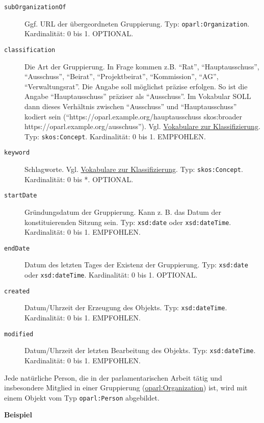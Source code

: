 \documentclass[,a4paper]{article}
\begin{document}
\begin{description}
\item[\texttt{subOrganizationOf}]
Ggf. URL der übergeordneten Gruppierung. Typ:
\texttt{oparl:Organization}. Kardinalität: 0 bis 1. OPTIONAL.
\item[\texttt{classification}]
Die Art der Gruppierung. In Frage kommen z.B. ``Rat'',
``Hauptausschuss'', ``Ausschuss'', ``Beirat'', ``Projektbeirat'',
``Kommission'', ``AG'', ``Verwaltungsrat''. Die Angabe soll möglichst
präzise erfolgen. So ist die Angabe ``Hauptausschuss'' präziser als
``Ausschuss''. Im Vokabular SOLL dann dieses Verhältnis zwischen
``Ausschuss'' und ``Hauptausschuss'' kodiert sein
(``https://oparl.example.org/hauptausschuss skos:broader
https://oparl.example.org/ausschuss''). Vgl.
\hyperref[vokabulareux5fklassifizierung]{Vokabulare zur
Klassifizierung}. Typ: \texttt{skos:Concept}. Kardinalität: 0 bis 1.
EMPFOHLEN.
\item[\texttt{keyword}]
Schlagworte. Vgl. \hyperref[vokabulareux5fklassifizierung]{Vokabulare
zur Klassifizierung}. Typ: \texttt{skos:Concept}. Kardinalität: 0 bis *.
OPTIONAL.
\item[\texttt{startDate}]
Gründungsdatum der Gruppierung. Kann z. B. das Datum der
konstituierenden Sitzung sein. Typ: \texttt{xsd:date} oder
\texttt{xsd:dateTime}. Kardinalität: 0 bis 1. EMPFOHLEN.
\item[\texttt{endDate}]
Datum des letzten Tages der Existenz der Gruppierung. Typ:
\texttt{xsd:date} oder \texttt{xsd:dateTime}. Kardinalität: 0 bis 1.
OPTIONAL.
\item[\texttt{created}]
Datum/Uhrzeit der Erzeugung des Objekts. Typ: \texttt{xsd:dateTime}.
Kardinalität: 0 bis 1. EMPFOHLEN.
\item[\texttt{modified}]
Datum/Uhrzeit der letzten Bearbeitung des Objekts. Typ:
\texttt{xsd:dateTime}. Kardinalität: 0 bis 1. EMPFOHLEN.
\end{description}


Jede natürliche Person, die in der parlamentarischen Arbeit tätig und
insbesondere Mitglied in einer Gruppierung
(\hyperref[oparlux5forganization]{oparl:Organization}) ist, wird mit
einem Objekt vom Typ \texttt{oparl:Person} abgebildet.

\textbf{Beispiel}
\end{document}
